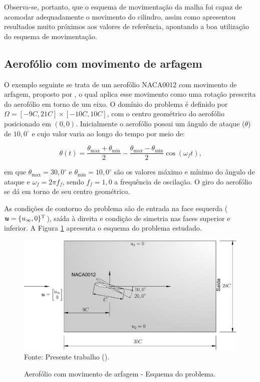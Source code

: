 Observa-se, portanto, que o esquema de movimentação da malha foi capaz de acomodar adequadamente o movimento do cilindro, assim como apresentou resultados muito próximos aos valores de referência, apontando a boa utilização do esquema de movimentação.

\subsection{Aerofólio com movimento de arfagem}

O exemplo seguinte se trata de um aerofólio NACA0012 com movimento de arfagem, proposto por , o qual aplica esse movimento como uma rotação prescrita do aerofólio em torno de um eixo. O domínio do problema é definido por $\Omega=[-9C, 21C]\times[-10C, 10C]$, com o centro geométrico do aerofólio posicionado em $(0,0)$. Inicialmente o aerofólio possui um ângulo de ataque ($\theta$) de $10,0^\circ$ e cujo valor varia ao longo do tempo por meio de:

\begin{equation}
    \theta(t)=\frac{\theta_\mathrm{max}+\theta_\mathrm{min}}{2}-\frac{\theta_\mathrm{max}-\theta_\mathrm{min}}{2}\cos{(\omega_f t)}\text{,}
\end{equation}

\noindent em que $\theta_\mathrm{max}=30,0^\circ$ e $\theta_\mathrm{min}=10,0^\circ$ são os valores máximo e mínimo do ângulo de ataque e $\omega_f=2\pi f_f$, sendo $f_f=1,0$ a frequência de oscilação. O giro do aerofólio se dá em torno de seu centro geométrico.

As condições de contorno do problema são de entrada na face esquerda ($\boldsymbol{u}=\{u_\infty,0\}^\mathrm{T}$), saída à direita e condição de simetria nas faces superior e inferior. A Figura \ref{fig:rotating-airfoil} apresenta o esquema do problema estudado.

\begin{figure}[h!]
    \centering
    \caption{Aerofólio com movimento de arfagem - Esquema do problema.}
    \includegraphics[width=.8\linewidth]{Figuras/rotating-airfoil/rotating-airfoil.pdf}
    \\Fonte: Presente trabalho (\the\year).
    \label{fig:rotating-airfoil}
\end{figure}


